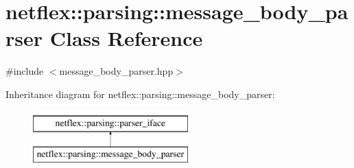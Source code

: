 \hypertarget{classnetflex_1_1parsing_1_1message__body__parser}{}\section{netflex\+:\+:parsing\+:\+:message\+\_\+body\+\_\+parser Class Reference}
\label{classnetflex_1_1parsing_1_1message__body__parser}


{\ttfamily \#include $<$message\+\_\+body\+\_\+parser.\+hpp$>$}

Inheritance diagram for netflex\+:\+:parsing\+:\+:message\+\_\+body\+\_\+parser\+:\begin{figure}[H]
\begin{center}
\leavevmode
\includegraphics[height=2.000000cm]{classnetflex_1_1parsing_1_1message__body__parser}
\end{center}
\end{figure}
